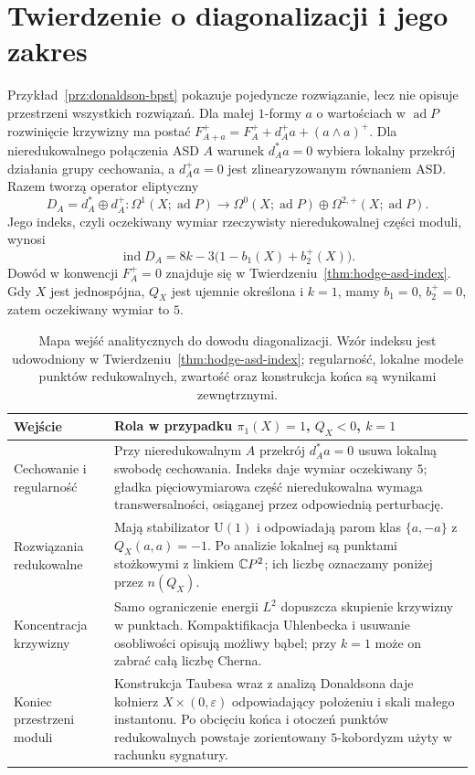 \section{Twierdzenie o diagonalizacji i jego zakres}
\label{sec:donaldson-diagonalizacja}

Przykład~\ref{prz:donaldson-bpst} pokazuje pojedyncze
rozwiązanie, lecz nie opisuje przestrzeni wszystkich rozwiązań.
Dla małej $1$-formy $a$ o wartościach w $\operatorname{ad}P$
rozwinięcie krzywizny ma postać
$F_{A+a}^+=F_A^++d_A^+a+(a\wedge a)^+$.
Dla nieredukowalnego połączenia ASD $A$ warunek
$d_A^*a=0$ wybiera lokalny
przekrój działania grupy cechowania, a $d_A^+a=0$ jest
zlinearyzowanym równaniem ASD. Razem tworzą operator
eliptyczny
\[
 D_A=d_A^*\oplus d_A^+:
 \Omega^1(X;\operatorname{ad}P)\longrightarrow
 \Omega^0(X;\operatorname{ad}P)\oplus
 \Omega^{2,+}(X;\operatorname{ad}P).
\]
Jego indeks, czyli oczekiwany wymiar rzeczywisty
nieredukowalnej części moduli, wynosi
\begin{equation}\label{eq:donaldson-expected-dimension}
 \operatorname{ind}D_A
 =8k-3\bigl(1-b_1(X)+b_2^+(X)\bigr).
\end{equation}
Dowód w konwencji $F_A^+=0$ znajduje się w
Twierdzeniu~\ref{thm:hodge-asd-index}.
Gdy $X$ jest jednospójna, $Q_X$ jest ujemnie
określona i $k=1$, mamy $b_1=0$, $b_2^+=0$,
zatem oczekiwany wymiar to $5$.

\begin{table}[htbp]
\centering
\small
\renewcommand{\arraystretch}{1.16}
\begin{tabular}{@{}p{3.25cm}p{11.15cm}@{}}
\hline
Wejście & Rola w przypadku $\pi_1(X)=1$, $Q_X<0$, $k=1$ \\
\hline
Cechowanie i regularność &
Przy nieredukowalnym $A$ przekrój $d_A^*a=0$ usuwa
lokalną swobodę cechowania.
Indeks daje wymiar oczekiwany $5$; gładka
pięciowymiarowa część nieredukowalna wymaga
transwersalności, osiąganej przez odpowiednią perturbację. \\
Rozwiązania redukowalne &
Mają stabilizator $\mathrm{U}(1)$ i odpowiadają parom
klas $\{a,-a\}$ z $Q_X(a,a)=-1$. Po analizie lokalnej
są punktami stożkowymi z linkiem $\mathbb{C} P^2$;
ich liczbę oznaczamy poniżej przez $n(Q_X)$. \\
Koncentracja krzywizny &
Samo ograniczenie energii $L^2$ dopuszcza skupienie
krzywizny w punktach. Kompaktifikacja Uhlenbecka
i usuwanie osobliwości opisują możliwy bąbel;
przy $k=1$ może on zabrać całą liczbę Cherna. \\
Koniec przestrzeni moduli &
Konstrukcja Taubesa wraz z analizą Donaldsona daje
kołnierz $X\times(0,\varepsilon)$ odpowiadający
położeniu i skali małego instantonu. Po obcięciu
końca i otoczeń punktów redukowalnych powstaje
zorientowany $5$-kobordyzm użyty w rachunku sygnatury. \\
\hline
\end{tabular}
\caption{Mapa wejść analitycznych do dowodu diagonalizacji.
Wzór indeksu jest udowodniony w
Twierdzeniu~\ref{thm:hodge-asd-index};
regularność, lokalne modele punktów redukowalnych,
zwartość oraz konstrukcja końca są wynikami zewnętrznymi.}
\label{tab:donaldson-analytic-inputs}
\end{table}

